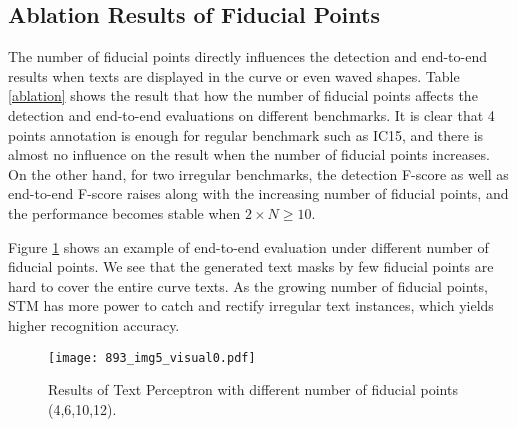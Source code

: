 \documentclass[letterpaper]{article} \usepackage{aaai20}  \usepackage{times}  \usepackage{helvet} \usepackage{courier}  \usepackage[hyphens]{url}  \usepackage{graphicx} \urlstyle{rm} \def\UrlFont{\rm}  \usepackage{graphicx}  \frenchspacing  \setlength{\pdfpagewidth}{8.5in}  \setlength{\pdfpageheight}{11in}  \usepackage{amsmath}
\begin{document}
\subsection{Ablation Results of Fiducial Points}
The number of fiducial points directly influences the detection and end-to-end results when texts are displayed in the curve or even waved shapes. Table \ref{ablation} shows the result that how the number of  fiducial points affects the detection and end-to-end evaluations on different benchmarks.
It is clear that 4 points annotation is enough for regular benchmark such as IC15, and there is almost no influence on the result when the number of fiducial points increases.
On the other hand, for two irregular benchmarks, the detection F-score as well as end-to-end F-score raises along with the increasing number of fiducial points, and the performance becomes stable when $2\times N\ge10$.
\begin{table}
\centering
{}
\caption{Detection (top part) and end-to-end (bottom part) evaluation (F-measure) under varied number of fiducial points for different benchmarks.}
\label{ablation}
\end{table}

Figure \ref{points} shows an example of end-to-end evaluation under different number of fiducial points. We see that the generated text masks by few fiducial points are hard to cover the entire curve texts. As the growing number of fiducial points, STM has more power to catch and rectify irregular text instances, which yields higher recognition accuracy.
\begin{figure}[t]
\centering
\texttt{[image: 893\_img5\_visual0.pdf]}\\
\caption{Results of Text Perceptron with different number of fiducial points (4,6,10,12).}
\label{points}
\end{figure}
\end{document}
